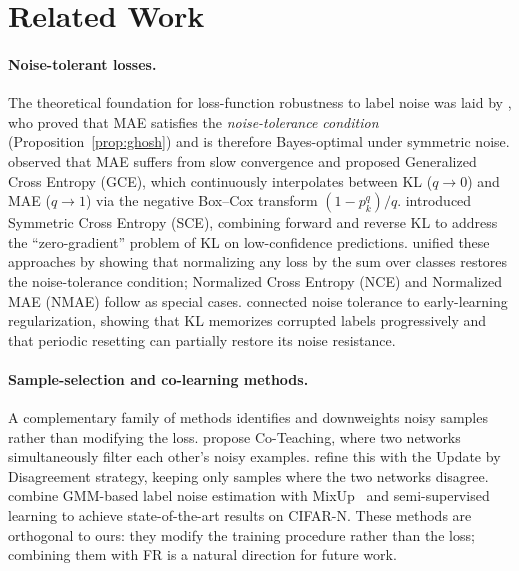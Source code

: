 \documentclass[11pt]{article}
\begin{document}
\section{Related Work}

\paragraph{Noise-tolerant losses.}
The theoretical foundation for loss-function robustness to label noise was laid
by \citet{ghosh2017robust}, who proved that MAE satisfies the
\emph{noise-tolerance condition} (Proposition~\ref{prop:ghosh}) and is therefore
Bayes-optimal under symmetric noise.
\citet{zhang2018generalized} observed that MAE suffers from slow convergence
and proposed Generalized Cross Entropy (GCE), which continuously interpolates
between KL ($q\to 0$) and MAE ($q\to 1$) via the negative Box--Cox transform
$(1-p_k^q)/q$.
\citet{wang2019symmetric} introduced Symmetric Cross Entropy (SCE), combining
forward and reverse KL to address the ``zero-gradient'' problem of KL on
low-confidence predictions.
\citet{ma2020normalized} unified these approaches by showing that normalizing
any loss by the sum over classes restores the noise-tolerance condition;
Normalized Cross Entropy (NCE) and Normalized MAE (NMAE) follow as special
cases.
\citet{liu2020earlylearning} connected noise tolerance to early-learning
regularization, showing that KL memorizes corrupted labels progressively and
that periodic resetting can partially restore its noise resistance.

\paragraph{Sample-selection and co-learning methods.}
A complementary family of methods identifies and downweights noisy samples
rather than modifying the loss.
\citet{han2018coteaching} propose Co-Teaching, where two networks
simultaneously filter each other's noisy examples.
\citet{yu2019disagreement} refine this with the Update by Disagreement
strategy, keeping only samples where the two networks disagree.
\citet{li2020dividemix} combine GMM-based label noise estimation with
MixUp~\citep{zhang2018mixup} and semi-supervised learning to achieve
state-of-the-art results on CIFAR-N.
These methods are orthogonal to ours: they modify the training procedure
rather than the loss; combining them with FR is a natural direction for
future work.
\end{document}
